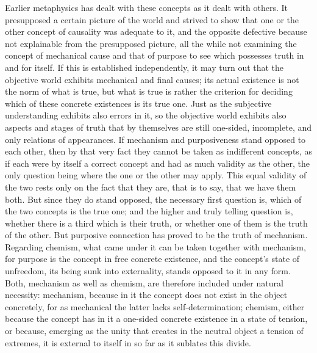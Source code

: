 Earlier metaphysics has dealt with these concepts
as it dealt with others.
It presupposed a certain picture of the world
and strived to show that one or the other concept
of causality was adequate to it,
and the opposite defective because
not explainable from the presupposed picture,
all the while not examining the concept of
mechanical cause and that of purpose to see
which possesses truth in and for itself.
If this is established independently, it may turn out
that the objective world exhibits mechanical and final causes;
its actual existence is not the norm of what is true,
but what is true is rather the criterion for deciding
which of these concrete existences is its true one.
Just as the subjective understanding exhibits also errors in it,
so the objective world exhibits also aspects and stages of truth
that by themselves are still one-sided, incomplete,
and only relations of appearances.
If mechanism and purposiveness stand opposed to each other,
then by that very fact they cannot
be taken as indifferent concepts,
as if each were by itself a correct concept
and had as much validity as the other,
the only question being where
the one or the other may apply.
This equal validity of the two rests
only on the fact that they are,
that is to say, that we have them both.
But since they do stand opposed,
the necessary first question is,
which of the two concepts is the true one;
and the higher and truly telling question is,
whether there is a third which is their truth,
or whether one of them is the truth of the other.
But purposive connection has proved
to be the truth of mechanism.
Regarding chemism, what came under it
can be taken together with mechanism,
for purpose is the concept in free concrete existence,
and the concept's state of unfreedom,
its being sunk into externality,
stands opposed to it in any form.
Both, mechanism as well as chemism, are
therefore included under natural necessity:
mechanism, because in it the concept
does not exist in the object concretely,
for as mechanical the latter lacks self-determination;
chemism, either because the concept has in it
a one-sided concrete existence in a state of tension,
or because, emerging as the unity that creates
in the neutral object a tension of extremes,
it is external to itself in so far as it sublates this divide.

